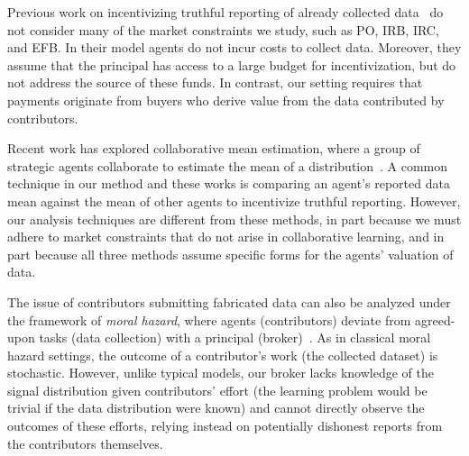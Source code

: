 Previous work on incentivizing truthful reporting of already collected data~\citep{zheng2024truthful,chen2020truthful} do not consider many of the market constraints we study, such as PO, IRB, IRC, and EFB. In their model agents do not incur costs to collect data.
Moreover, they assume that the  principal has access to a large budget for incentivization, but do not address the source of these funds. In contrast, our setting requires that payments originate from buyers who derive value from the data contributed by contributors.




Recent work has explored collaborative mean estimation, where a group of strategic agents collaborate to estimate the mean of a  distribution~\citep{chen2023mechanism,clinton2024collaborative,dorner2023incentivizing}. A common technique in our method and these works is comparing an agent’s reported data mean against the mean of other agents to incentivize truthful reporting. However, our analysis techniques are different from these methods, in part because we must adhere to market constraints that do not arise in collaborative learning, and in part because all three methods assume
specific forms for the agents' valuation of data.


The issue of contributors submitting fabricated data can also be analyzed under the framework of \emph{moral hazard}, where agents (contributors) deviate from agreed-upon tasks (data collection) with a principal (broker)~\citep{laffont2009theory,holmstrom1979moral,mirrlees1999theory,helpman1975moral}. As in classical moral hazard settings, the outcome of a contributor’s work (the collected dataset) is stochastic. However, unlike typical models, our broker lacks knowledge of the signal distribution given contributors' effort (the learning problem would be trivial if the data distribution were known) and cannot directly observe the outcomes of these efforts, relying instead on potentially dishonest reports from the contributors themselves.



